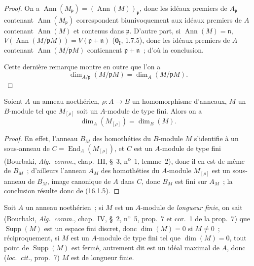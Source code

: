 \begin{proof}
On a
$\operatorname{Ann}(M_{\mathfrak{p}})=(\operatorname{Ann}(M))_{\mathfrak{p}}$,
donc les idéaux premiers de $A_{\mathfrak{p}}$ contenant
$\operatorname{Ann}(M_{\mathfrak{p}})$ correspondent biunivoquement aux
idéaux premiers de $A$ contenant $\operatorname{Ann}(M)$ et contenus dans
$\mathfrak{p}$. D'autre part, si $\operatorname{Ann}(M)=\mathfrak{n}$,
$V(\operatorname{Ann}(M/\mathfrak{p}M))=V(\mathfrak{p}+\mathfrak{n})$
($\mathbf{0}_{\mathrm I}$, 1.7.5), donc les idéaux premiers de $A$ contenant
$\operatorname{Ann}(M/\mathfrak{p}M)$ contiennent
$\mathfrak{p}+\mathfrak{n}$~; d'où la conclusion.

Cette dernière remarque montre en outre que l'on a
\[
\label{0.16.1.8.2-fr}
  \dim_{A/\mathfrak{p}}(M/\mathfrak{p}M)=\dim_A(M/\mathfrak{p}M).
\tag{16.1.8.2}
\]
\end{proof}

\begin{proposition}[16.1.9]
\label{0.16.1.9-fr}
Soient $A$ un anneau noethérien, $\rho:A\to B$ un homomorphisme d'anneaux,
$M$ un $B$-module tel que $M_{[\rho]}$ soit un $A$-module de type fini. Alors
on a
\[
\label{0.16.1.9.1-fr}
  \dim_A(M_{[\rho]})=\dim_B(M).
\tag{16.1.9.1}
\]
\end{proposition}

\begin{proof}
En effet, l'anneau $B_M$ des homothéties du $B$-module $M$ s'identifie à un
sous-anneau de $C=\operatorname{End}_A(M_{[\rho]})$, et $C$ est un $A$-module
de type fini (Bourbaki, \emph{Alg.~comm.}, chap.~III, \S~3, n\textsuperscript{o}~1, lemme~2),
donc il en est de même de $B_M$~; d'ailleurs l'anneau $A_M$ des homothéties du
$A$-module $M_{[\rho]}$ est un sous-anneau de $B_M$, image canonique de $A$
dans $C$, donc $B_M$ est fini sur $A_M$~; la conclusion résulte donc de
(16.1.5).
\end{proof}

\begin{env}[16.1.10]
\label{0.16.1.10-fr}
Soit $A$ un anneau noethérien~; si $M$ est un $A$-module de \emph{longueur finie}, on
sait (Bourbaki, \emph{Alg.~comm.}, chap.~IV, \S~2, n\textsuperscript{o}~5, prop.~7 et cor.~1 de
la prop.~7) que $\operatorname{Supp}(M)$ est un espace fini discret, donc
$\dim(M)=0$ si $M\neq0$~; réciproquement, si $M$ est un $A$-module de type
fini tel que $\dim(M)=0$, tout point de $\operatorname{Supp}(M)$ est fermé,
autrement dit est un idéal maximal de $A$, donc (\emph{loc.~cit.}, prop.~7)
$M$ est de longueur finie.
\end{env}

